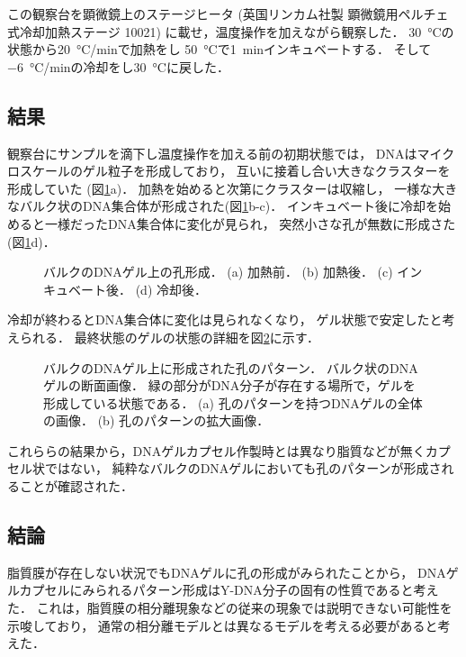 この観察台を顕微鏡上のステージヒータ
(英国リンカム社製 顕微鏡用ペルチェ式冷却加熱ステージ 10021)
に載せ，温度操作を加えながら観察した．
\SI{30}{\celsius}の状態から\SI{20}{\celsius/min}で加熱をし
\SI{50}{\celsius}で\SI{1}{min}インキュベートする．
そして\SI{-6}{\celsius/min}の冷却をし\SI{30}{\celsius}に戻した．


\subsection{結果}
観察台にサンプルを滴下し温度操作を加える前の初期状態では，
DNAはマイクロスケールのゲル粒子を形成しており，
互いに接着し合い大きなクラスターを形成していた
(図\ref{fig:result_dnagel_formation}a)．%
加熱を始めると次第にクラスターは収縮し，
一様な大きなバルク状のDNA集合体が形成された(図\ref{fig:result_dnagel_formation}b-c)．
インキュベート後に冷却を始めると一様だったDNA集合体に変化が見られ，
突然小さな孔が無数に形成さた(図\ref{fig:result_dnagel_formation}d)．
\begin{figure}
    \centering
    
    \caption{バルクのDNAゲル上の孔形成．
        (a) 加熱前．
        (b) 加熱後．
        (c) インキュベート後．
        (d) 冷却後．
    }
    \label{fig:result_dnagel_formation}
\end{figure}

冷却が終わるとDNA集合体に変化は見られなくなり，
ゲル状態で安定したと考えられる．
最終状態のゲルの状態の詳細を図\ref{fig:result_dnagel}に示す．
\begin{figure}
    \centering
    
    \caption{バルクのDNAゲル上に形成された孔のパターン．
        バルク状のDNAゲルの断面画像．
        緑の部分がDNA分子が存在する場所で，ゲルを形成している状態である．
        (a) 孔のパターンを持つDNAゲルの全体の画像．
        (b) 孔のパターンの拡大画像．
    }
    \label{fig:result_dnagel}
\end{figure}

これららの結果から，DNAゲルカプセル作製時とは異なり脂質などが無くカプセル状ではない，
純粋なバルクのDNAゲルにおいても孔のパターンが形成されることが確認された．


\subsection{結論}
脂質膜が存在しない状況でもDNAゲルに孔の形成がみられたことから，
DNAゲルカプセルにみられるパターン形成はY-DNA分子の固有の性質であると考えた．
これは，脂質膜の相分離現象などの従来の現象では説明できない可能性を示唆しており，
通常の相分離モデルとは異なるモデルを考える必要があると考えた．


